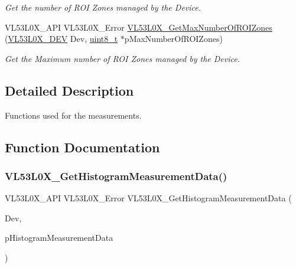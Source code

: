 \begin{DoxyCompactItemize}
\begin{DoxyCompactList}\small\item\em Get the number of R\+OI Zones managed by the Device. \end{DoxyCompactList}\item 
V\+L53\+L0\+X\+\_\+\+A\+PI V\+L53\+L0\+X\+\_\+\+Error \hyperlink{group__VL53L0X__measurement__group_gad3d40b6a62638f54f2a87289030e27e7}{V\+L53\+L0\+X\+\_\+\+Get\+Max\+Number\+Of\+R\+O\+I\+Zones} (\hyperlink{group__VL53L0X__platform__group_ga2d6405308b1dd524b462f1b8fb97d167}{V\+L53\+L0\+X\+\_\+\+D\+EV} Dev, \hyperlink{vl53l0x__types_8h_aba7bc1797add20fe3efdf37ced1182c5}{uint8\+\_\+t} $\ast$p\+Max\+Number\+Of\+R\+O\+I\+Zones)
\begin{DoxyCompactList}\small\item\em Get the Maximum number of R\+OI Zones managed by the Device. \end{DoxyCompactList}\end{DoxyCompactItemize}


\subsection{Detailed Description}
Functions used for the measurements. 



\subsection{Function Documentation}
\mbox{\label{group__VL53L0X__measurement__group_ga774bd207d8451e932a524bd24c19e761}} 
\subsubsection{\texorpdfstring{V\+L53\+L0\+X\+\_\+\+Get\+Histogram\+Measurement\+Data()}{VL53L0X\_GetHistogramMeasurementData()}}
{\footnotesize\ttfamily V\+L53\+L0\+X\+\_\+\+A\+PI V\+L53\+L0\+X\+\_\+\+Error V\+L53\+L0\+X\+\_\+\+Get\+Histogram\+Measurement\+Data (\begin{DoxyParamCaption}\item[{\hyperlink{group__VL53L0X__platform__group_ga2d6405308b1dd524b462f1b8fb97d167}{V\+L53\+L0\+X\+\_\+\+D\+EV}}]{Dev,  }\item[{\hyperlink{structVL53L0X__HistogramMeasurementData__t}{V\+L53\+L0\+X\+\_\+\+Histogram\+Measurement\+Data\+\_\+t} $\ast$}]{p\+Histogram\+Measurement\+Data }\end{DoxyParamCaption})}



